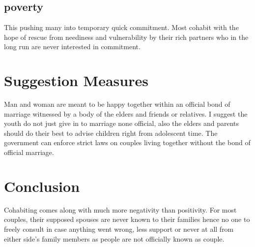 \documentclass[12pt]{article}
\begin{document}
\subsection{poverty}
	
This pushing many into temporary quick commitment. Most cohabit with the hope of rescue from neediness and vulnerability by their rich partners who in the long run are never interested in commitment.

\section{Suggestion Measures}
Man and woman are meant to be happy together within an official bond of marriage witnessed by a body of the elders and friends or relatives. I suggest the youth do not just give in to marriage none official, also the elders and parents should do their best to advise children right from adolescent time. The government can enforce strict laws on couples living together without the bond of official marriage.

\section{Conclusion}
Cohabiting comes along with much more negativity than positivity. For most couples, their supposed spouses are never known to their families hence no one to freely consult in case anything went wrong, less support or never at all from either side's family members as people are not officially known as couple.
\end{document}
